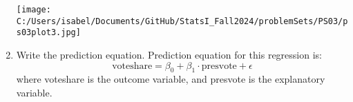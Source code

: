 \documentclass[12pt,letterpaper]{article}
\begin{document}
\begin{enumerate}
		\vspace{0.1cm}
		 
		\texttt{[image: C:/Users/isabel/Documents/GitHub/StatsI\_Fall2024/problemSets/PS03/ps03plot3.jpg]}
		\vspace{0.1cm}
		\item Write the prediction equation.
		\text Prediction equation for this regression is:
		\[
		\text{voteshare} = \beta_0 + \beta_1 \cdot \text{presvote} + \epsilon
		\]
		\vspace{5cm}
		\text where voteshare is the outcome variable, and presvote is the explanatory variable.
	\end{enumerate}
	

\newpage	
\end{document}
